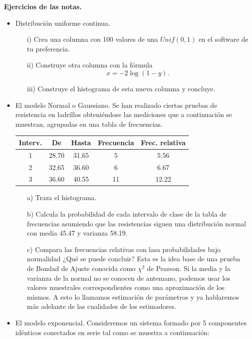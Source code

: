 \documentclass[11pt,letterpaper]{article}
\begin{document}
\textbf{Ejercicios de las notas. }
\begin{itemize}

\item Distribución uniforme continua.
\begin{itemize}
\item[i)] Crea una columna con 100 valores de una $Unif(0,1)$ en el software de tu preferencia.
\item[ii)] Construye otra columna con la fórmula $$x=-2\log(1-y).$$
\item[iii)] Construye el histograma de esta nueva columna y concluye.
\end{itemize} 

\item El modelo Normal o Gaussiano. Se han realizado ciertas pruebas de resistencia en ladrillos obteniéndose las mediciones que a continuación se muestran, agrupadas en una tabla de frecuencias.
\begin{table}[H]
\centering
\begin{tabular}{ccccc}
\hline
Interv. & De & Hasta & Frecuencia & Frec. relativa\\ \hline
1 & 28.70 & 31.65 & 5 & 5.56\\
2 & 32.65 & 36.60 & 6 & 6.67\\
3 & 36.60 & 40.55 &11 & 12.22\\
\hline
\end{tabular}
\end{table}
\begin{itemize}
\item[a)] Traza el histograma.
\item[b)] Calcula la probabilidad de cada intervalo de clase de la tabla de frecuencias asumiendo que las resistencias siguen una distribución normal con media 45.47 y varianza 58.19.
\item[c)] Compara las frecuencias relativas con lasa probabilidades bajo normalidad ¿Qué se puede concluir? Esta es la idea base de una prueba de Bondad de Ajuste conocida como $\chi^2$ de Pearson. Si la media y la varianza de la normal no se conocen de antemano, podemos usar los valores muestrales correspondientes como una aproximación de los mismos. A esto lo llamamos estimación de parámetros y ya hablaremos más adelante de las cualidades de los estimadores.
\end{itemize}

\item El modelo exponencial. Consideremos un sistema formado por 5 componentes idénticos conectados en serie tal como se muestra a continuación:


\end{itemize}
\end{document}
